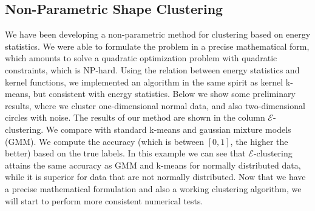 \documentclass[simplex.tex]{subfiles}
\begin{document}
\subsection{Non-Parametric Shape Clustering}

We have been developing a non-parametric method for clustering
based on energy statistics. We were able to formulate the problem
in a precise mathematical form, which amounts to solve a quadratic
optimization problem with quadratic constraints, which is NP-hard.
Using the relation between energy statistics and kernel functions, we
implemented an algorithm in the same spirit as kernel k-means, but
consistent with energy statistics. Below we show some preliminary results,
where we cluster one-dimensional normal data, and also two-dimensional
circles with noise. The results of our method are shown in the column
$\mathcal{E}$-clustering. We compare with standard k-means and gaussian
mixture models (GMM). We compute the accuracy (which is 
between $[0,1]$, the higher
the better) based on the true labels.
In this example we can see that $\mathcal{E}$-clustering attains the
same accuracy as GMM and k-means for normally distributed data, while
it is superior for data that are not normally distributed.
Now that we have a precise mathematical formulation and also a working
clustering
algorithm, we will start to perform more consistent numerical tests.
\end{document}
